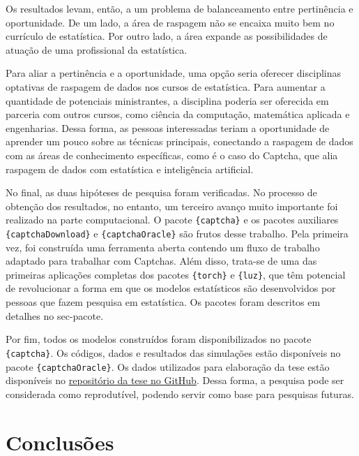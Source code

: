 \documentclass[12pt,twoside,brazilian]{book}
\begin{document}
Os resultados levam, então, a um problema de balanceamento entre
pertinência e oportunidade. De um lado, a área de raspagem não se
encaixa muito bem no currículo de estatística. Por outro lado, a área
expande as possibilidades de atuação de uma profissional da estatística.

Para aliar a pertinência e a oportunidade, uma opção seria oferecer
disciplinas optativas de raspagem de dados nos cursos de estatística.
Para aumentar a quantidade de potenciais ministrantes, a disciplina
poderia ser oferecida em parceria com outros cursos, como ciência da
computação, matemática aplicada e engenharias. Dessa forma, as pessoas
interessadas teriam a oportunidade de aprender um pouco sobre as
técnicas principais, conectando a raspagem de dados com as áreas de
conhecimento específicas, como é o caso do Captcha, que alia raspagem de
dados com estatística e inteligência artificial.

No final, as duas hipóteses de pesquisa foram verificadas. No processo
de obtenção dos resultados, no entanto, um terceiro avanço muito
importante foi realizado na parte computacional. O pacote
\texttt{\{captcha\}} e os pacotes auxiliares
\texttt{\{captchaDownload\}} e \texttt{\{captchaOracle\}} são frutos
desse trabalho. Pela primeira vez, foi construída uma ferramenta aberta
contendo um fluxo de trabalho adaptado para trabalhar com Captchas. Além
disso, trata-se de uma das primeiras aplicações completas dos pacotes
\texttt{\{torch\}} e \texttt{\{luz\}}, que têm potencial de revolucionar
a forma em que os modelos estatísticos são desenvolvidos por pessoas que
fazem pesquisa em estatística. Os pacotes foram descritos em detalhes no
sec-pacote.

Por fim, todos os modelos construídos foram disponibilizados no pacote
\texttt{\{captcha\}}. Os códigos, dados e resultados das simulações
estão disponíveis no pacote \texttt{\{captchaOracle\}}. Os dados
utilizados para elaboração da tese estão disponíveis no
\href{https://github.com/jtrecenti/doutorado}{repositório da tese no
GitHub}. Dessa forma, a pesquisa pode ser considerada como reprodutível,
podendo servir como base para pesquisas futuras.


\hypertarget{conclusao}{%
\chapter{Conclusões}\label{conclusao}}

\end{document}
